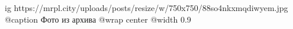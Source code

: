  
 
 
 
 

\ifcmt
  ig https://mrpl.city/uploads/posts/resize/w/750x750/88so4nkxmqdiwyem.jpg
	@caption Фото из архива
  @wrap center
  @width 0.9
\fi

